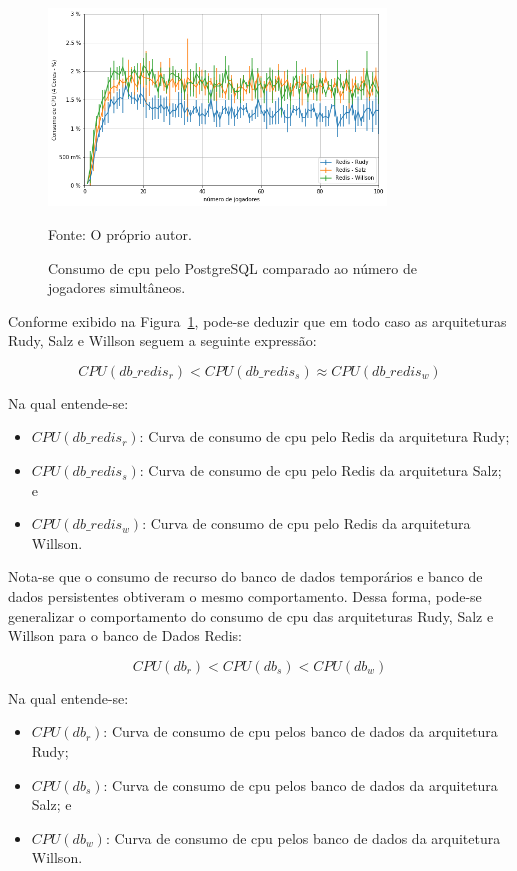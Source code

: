 \begin{figure}[htb!]
  \caption{Consumo de \ac{cpu} pelo PostgreSQL comparado ao número de jogadores simultâneos.}
  \label{fig:cpu_redis_media_por_jogador}
  \includegraphics[width=0.8\textwidth]{figuras/analise/cpu_redis_media_por_jogador.png}
  \centering

  Fonte: O próprio autor.
\end{figure}

Conforme exibido na Figura~\ref{fig:cpu_redis_media_por_jogador}, pode-se deduzir que em todo caso as arquiteturas Rudy, Salz e Willson seguem a seguinte expressão:

$$
    CPU(db\_redis_{r}) < CPU(db\_redis_{s}) \approx CPU(db\_redis_{w})
$$

Na qual entende-se:

\begin{itemize}
\item $CPU(db\_redis_{r})$: Curva de consumo de \ac{cpu} pelo Redis da arquitetura Rudy;
\item $CPU(db\_redis_{s})$: Curva de consumo de \ac{cpu} pelo Redis da arquitetura Salz; e
\item $CPU(db\_redis_{w})$: Curva de consumo de \ac{cpu} pelo Redis da arquitetura Willson.
\end{itemize}

Nota-se que o consumo de recurso do banco de dados temporários e banco de dados persistentes obtiveram o mesmo comportamento.
%
Dessa forma, pode-se generalizar o comportamento do consumo de \ac{cpu} das arquiteturas Rudy, Salz e Willson para o banco de Dados Redis:

$$
    CPU(db_{r}) < CPU(db_{s}) < CPU(db_{w})
$$

Na qual entende-se:

\begin{itemize}
\item $CPU(db_{r})$: Curva de consumo de \ac{cpu} pelos banco de dados da arquitetura Rudy;
\item $CPU(db_{s})$: Curva de consumo de \ac{cpu} pelos banco de dados da arquitetura Salz; e
\item $CPU(db_{w})$: Curva de consumo de \ac{cpu} pelos banco de dados da arquitetura Willson.
\end{itemize}

